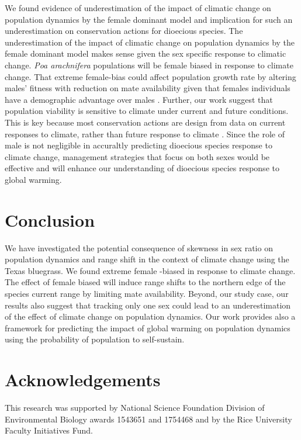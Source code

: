 \documentclass[12pt]{article}
\begin{document}
We found evidence of underestimation of the impact of climatic change on population dynamics by the female dominant model and implication for such an underestimation on conservation actions for dioecious species.
The underestimation of the impact of climatic change on population dynamics by the female dominant model makes sense given the sex specific response to climatic change. 
\emph{Poa arachnifera} populations will be female biased in response to climate change.
That extreme female-bias could affect population growth rate by altering males’ fitness with reduction on mate availability given that females individuals have a demographic advantage over males \citep{knight2005pollen,haridas2014frequency}.
Further, our work suggest that population viability is sensitive to climate under current  and future conditions.
This is key because most conservation actions are design from  data on current responses to climate, rather than future response to climate \citep{sletvold2013climate}.
Since the role of male is not negligible in accuraltly predicting dioecious species response to climate change, management strategies that focus on both sexes would be effective and will enhance our understanding of dioecious species response to global warming.

\section*{Conclusion}
We have investigated the potential consequence of skewness in sex ratio on population dynamics and range shift in the context of climate change using the Texas bluegrass. 
We found extreme female -biased in response to climate change. 
The effect of female biased will induce range shifts to the northern edge of the species current range by limiting mate availability.
Beyond, our study case, our results also suggest that tracking only one sex could lead to an underestimation of the effect of climate change on population dynamics. 
Our work  provides also a framework for predicting the impact of global warming on population dynamics using the probability of population to self-sustain. 

\section*{Acknowledgements}
This research was supported by National Science Foundation Division of Environmental Biology awards 1543651 and 1754468 and by the Rice University Faculty Initiatives Fund.
\end{document}
